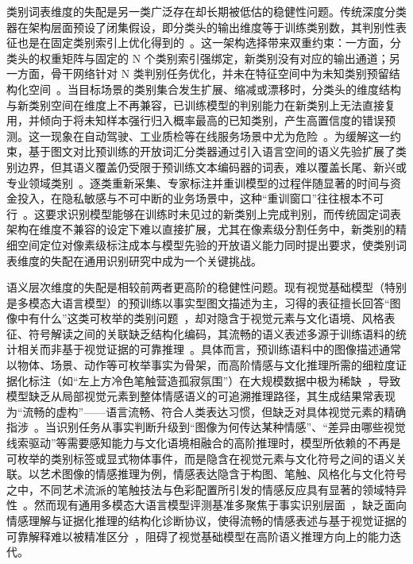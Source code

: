 类别词表维度的失配是另一类广泛存在却长期被低估的稳健性问题。传统深度分类器在架构层面预设了闭集假设，即分类头的输出维度等于训练类别数，其判别性表征也是在固定类别索引上优化得到的~\cite{radford2021learning}。这一架构选择带来双重约束：一方面，分类头的权重矩阵与固定的 N 个类别索引强绑定，新类别没有对应的输出通道；另一方面，骨干网络针对 N 类判别任务优化，并未在特征空间中为未知类别预留结构化空间~\cite{kundu2022towards}。当目标场景的类别集合发生扩展、缩减或漂移时，分类头的维度结构与新类别空间在维度上不再兼容，已训练模型的判别能力在新类别上无法直接复用，并倾向于将未知样本强行归入概率最高的已知类别，产生高置信度的错误预测。这一现象在自动驾驶、工业质检等在线服务场景中尤为危险~\cite{kirillov2023segment}。为缓解这一约束，基于图文对比预训练的开放词汇分类器通过引入语言空间的语义先验扩展了类别边界，但其语义覆盖仍受限于预训练文本编码器的词表，难以覆盖长尾、新兴或专业领域类别~\cite{radford2021learning}。逐类重新采集、专家标注并重训模型的过程伴随显著的时间与资金投入，在隐私敏感与不可中断的业务场景中，这种``重训窗口''往往根本不可行~\cite{kirillov2023segment}。这要求识别模型能够在训练时未见过的新类别上完成判别，而传统固定词表架构在维度不兼容的设定下难以直接扩展，尤其在像素级分割任务中，新类别的精细空间定位对像素级标注成本与模型先验的开放语义能力同时提出要求，使类别词表维度的失配在通用识别研究中成为一个关键挑战。

语义层次维度的失配是相较前两者更高阶的稳健性问题。现有视觉基础模型（特别是多模态大语言模型）的预训练以事实型图文描述为主，习得的表征擅长回答“图像中有什么”这类可枚举的类别问题~\cite{mmbench2023}，却对隐含于视觉元素与文化语境、风格表征、符号解读之间的关联缺乏结构化编码，其流畅的语义表述多源于训练语料的统计相关而非基于视觉证据的可靠推理~\cite{achlioptas2021artemis,zhao2014exploring}。具体而言，预训练语料中的图像描述通常以物体、场景、动作等可枚举事实为骨架，而高阶情感与文化推理所需的细粒度证据化标注（如“左上方冷色笔触营造孤寂氛围”）在大规模数据中极为稀缺~\cite{aesexpert2024}，导致模型缺乏从局部视觉元素到整体情感语义的可追溯推理路径，其生成结果常表现为“流畅的虚构”——语言流畅、符合人类表达习惯，但缺乏对具体视觉元素的精确指涉~\cite{eemobench2025}。当识别任务从事实判断升级到“图像为何传达某种情感”、“差异由哪些视觉线索驱动”等需要感知能力与文化语境相融合的高阶推理时，模型所依赖的不再是可枚举的类别标签或显式物体事件，而是隐含在视觉元素与文化符号之间的语义关联。以艺术图像的情感推理为例，情感表达隐含于构图、笔触、风格化与文化符号之中，不同艺术流派的笔触技法与色彩配置所引发的情感反应具有显著的领域特异性~\cite{yang2023emoset}。然而现有通用多模态大语言模型评测基准多聚焦于事实识别层面~\cite{mmbench2023}，缺乏面向情感理解与证据化推理的结构化诊断协议，使得流畅的情感表述与基于视觉证据的可靠解释难以被精准区分~\cite{eemobench2025}，阻碍了视觉基础模型在高阶语义推理方向上的能力迭代。

